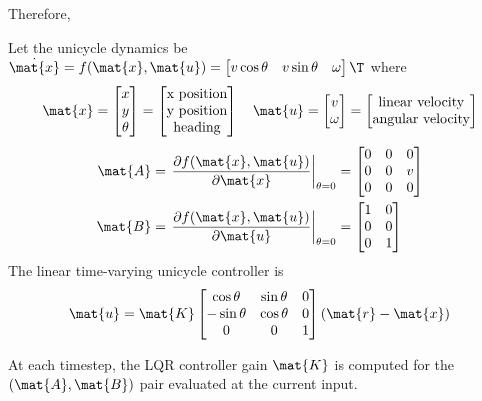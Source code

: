 Therefore,
\begin{theorem}
  \label{thm:linear_time-varying_unicycle_controller}

  Let the unicycle dynamics be
  $\dot{\mat{x}} = f(\mat{x}, \mat{u}) =
  \begin{bmatrix}
    v\cos\theta &
    v\sin\theta &
    \omega
  \end{bmatrix}\T$ where
  \begin{equation*}
    \mat{x} =
    \begin{bmatrix}
      x \\
      y \\
      \theta
    \end{bmatrix} =
    \begin{bmatrix}
      \text{x position} \\
      \text{y position} \\
      \text{heading}
    \end{bmatrix}
    \quad
    \mat{u} =
    \begin{bmatrix}
      v \\
      \omega
    \end{bmatrix} =
    \begin{bmatrix}
      \text{linear velocity} \\
      \text{angular velocity}
    \end{bmatrix}
  \end{equation*}
  \begin{align*}
    \mat{A} &= \left.
      \frac{\partial f(\mat{x}, \mat{u})}{\partial\mat{x}}
    \right|_{\theta = 0} =
    \begin{bmatrix}
      0 & 0 & 0 \\
      0 & 0 & v \\
      0 & 0 & 0
    \end{bmatrix} \\
    \mat{B} &= \left.
      \frac{\partial f(\mat{x}, \mat{u})}{\partial\mat{u}}
    \right|_{\theta = 0} =
    \begin{bmatrix}
      1 & 0 \\
      0 & 0 \\
      0 & 1
    \end{bmatrix}
  \end{align*}
  The linear time-varying unicycle controller is
  \begin{equation}
    \mat{u} = \mat{K}
    \begin{bmatrix}
      \cos\theta & \sin\theta & 0 \\
      -\sin\theta & \cos\theta & 0 \\
      0 & 0 & 1
    \end{bmatrix}
    (\mat{r} - \mat{x})
  \end{equation}

  At each timestep, the LQR controller gain $\mat{K}$ is computed for the
  $(\mat{A}, \mat{B})$ pair evaluated at the current input.
\end{theorem}


